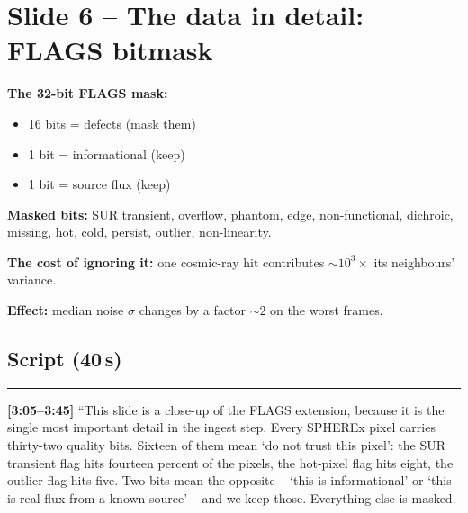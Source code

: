\documentclass[11pt,a4paper]{article}
\begin{document}
\section{Slide 6 -- The data in detail: FLAGS bitmask}

\textbf{The 32-bit FLAGS mask:}
\begin{itemize}[leftmargin=1em,itemsep=1pt]
\item 16 bits = defects (mask them)
\item 1 bit = informational (keep)
\item 1 bit = source flux (keep)
\end{itemize}

\textbf{Masked bits:} SUR transient, overflow, phantom, edge, non-functional, dichroic, missing,
hot, cold, persist, outlier, non-linearity.

\textbf{The cost of ignoring it:} one cosmic-ray hit contributes $\sim10^{3}\times$ its neighbours'
variance.

\textbf{Effect:} median noise $\sigma$ changes by a factor $\sim2$ on the worst frames.

\begin{center}
\end{center}

\subsection*{Script (40\,s)}
\noindent\rule{\linewidth}{0.3pt}\par\smallskip\noindent
\textbf{[3:05--3:45]} ``This slide is a close-up of the FLAGS extension, because it is the single most
important detail in the ingest step. Every SPHEREx pixel carries thirty-two quality bits. Sixteen of
them mean `do not trust this pixel': the SUR transient flag hits fourteen percent of the pixels, the
hot-pixel flag hits eight, the outlier flag hits five. Two bits mean the opposite -- `this is
informational' or `this is real flux from a known source' -- and we keep those. Everything else is
masked.
\end{document}
